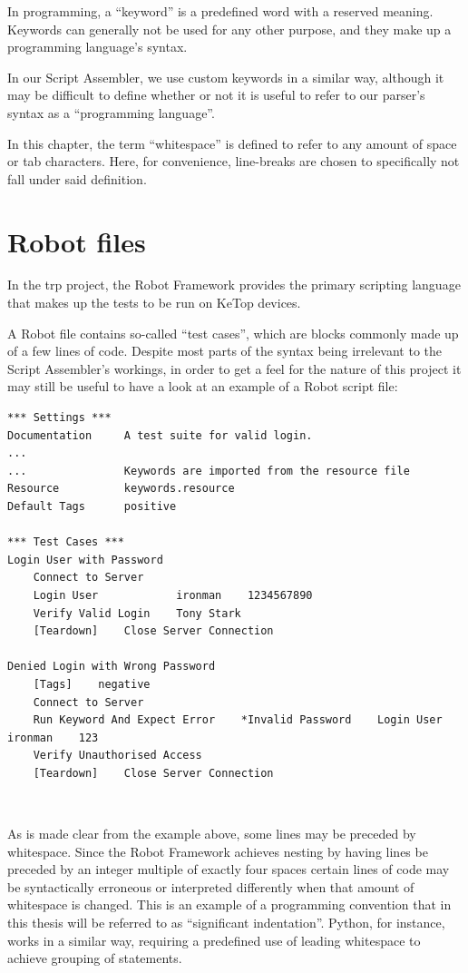 In programming, a ``keyword'' is a predefined word with a reserved meaning. Keywords can generally not be used for any other purpose, and they make up a programming language's syntax.\cite{keyword}

In our Script Assembler, we use custom keywords in a similar way, although it may be difficult to define whether or not it is useful to refer to our parser's syntax as a ``programming language''. 

In this chapter, the term ``whitespace'' is defined to refer to any amount of space or tab characters. Here, for convenience, line-breaks are chosen to specifically not fall under said definition.

\section{Robot files}

In the \gls{trp} project, the Robot Framework provides the primary scripting language that makes up the tests to be run on KeTop devices. 

A Robot file contains so-called ``test cases'', which are blocks commonly made up of a few lines of code.\cite{robot-framework} Despite most parts of the syntax being irrelevant to the Script Assembler's workings, in order to get a feel for the nature of this project it may still be useful to have a look at an example of a Robot script file:

\begin{lstlisting}
*** Settings ***
Documentation     A test suite for valid login.
...
...               Keywords are imported from the resource file
Resource          keywords.resource
Default Tags      positive

*** Test Cases ***
Login User with Password
    Connect to Server
    Login User            ironman    1234567890
    Verify Valid Login    Tony Stark
    [Teardown]    Close Server Connection

Denied Login with Wrong Password
    [Tags]    negative
    Connect to Server
    Run Keyword And Expect Error    *Invalid Password    Login User    ironman    123
    Verify Unauthorised Access
    [Teardown]    Close Server Connection
\end{lstlisting}~\cite{robot-framework}

As is made clear from the example above, some lines may be preceded by whitespace. Since the Robot Framework achieves nesting by having lines be preceded by an integer multiple of exactly four spaces certain lines of code may be syntactically erroneous or interpreted differently when that amount of whitespace is changed.\cite{robot-framework-style-guide} This is an example of a programming convention that in this thesis will be referred to as ``significant indentation''. Python, for instance, works in a similar way, requiring a predefined use of leading whitespace to achieve grouping of statements.\cite{py-indentation}

